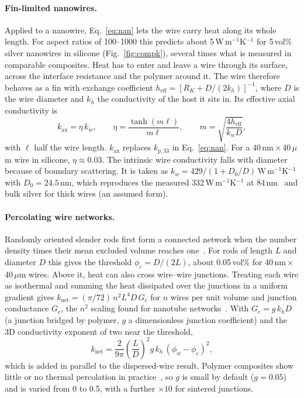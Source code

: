 \documentclass[11pt]{article}
\begin{document}
\paragraph{Fin-limited nanowires.} Applied to a nanowire, Eq.~\eqref{eq:nan} lets the
wire carry heat along its whole length. For aspect ratios of 100--1000 this predicts
about 5\,W\,m$^{-1}$K$^{-1}$ for 5\,vol\% silver nanowires in silicone
(Fig.~\ref{fig:compk}), several times what is measured in comparable composites. Heat
has to enter and leave a wire through its surface, across the interface resistance and
the polymer around it. The wire therefore behaves as a fin with exchange coefficient
$h_\mathrm{eff} = [R_K + D/(2k_h)]^{-1}$, where $D$ is the wire diameter and $k_h$ the
conductivity of the host it sits in. Its effective axial conductivity is
\begin{equation}
  k_\mathrm{ax} = \eta\,k_w, \qquad \eta = \frac{\tanh(m\ell)}{m\ell}, \qquad
  m = \sqrt{\frac{4h_\mathrm{eff}}{k_w D}},
  \label{eq:fin}
\end{equation}
with $\ell$ half the wire length. $k_\mathrm{ax}$ replaces $k_{p,33}$ in
Eq.~\eqref{eq:nan}. For a 40\,nm\,$\times$\,40\,$\mu$m wire in silicone,
$\eta \approx 0.03$. The intrinsic wire conductivity falls with diameter because of
boundary scattering. It is taken as $k_w = 429/(1 + D_0/D)$\,W\,m$^{-1}$K$^{-1}$ with
$D_0 = 24.5$\,nm, which reproduces the measured 332\,W\,m$^{-1}$K$^{-1}$ at
84\,nm~\cite{agnw_nsf} and bulk silver for thick wires (an assumed form).

\paragraph{Percolating wire networks.} Randomly oriented slender rods first form a
connected network when the number density times their mean excluded volume reaches
one~\cite{balberg1984,florian2001}. For rods of length $L$ and diameter $D$ this gives the
threshold $\phi_c = D/(2L)$, about 0.05\,vol\% for 40\,nm\,$\times$\,40\,$\mu$m wires.
Above it, heat can also cross wire--wire junctions. Treating each wire as isothermal and
summing the heat dissipated over the junctions in a uniform gradient gives
$k_\mathrm{net} = (\pi/72)\,n^2 L^4 D\,G_c$ for $n$ wires per unit volume and junction
conductance $G_c$, the $n^2$ scaling found for nanotube
networks~\cite{volkov2010}. With $G_c = g\,k_h D$ (a junction bridged by polymer, $g$
a dimensionless junction coefficient) and the 3D conductivity exponent of two near the
threshold,
\begin{equation}
  k_\mathrm{net} = \frac{2}{9\pi}\left(\frac{L}{D}\right)^{2} g\,k_h\,(\phi_w - \phi_c)^2 ,
  \label{eq:net}
\end{equation}
which is added in parallel to the dispersed-wire result. Polymer composites show little
or no thermal percolation in practice~\cite{shenogina2005}, so $g$ is small by default
($g = 0.05$) and is varied from 0 to 0.5, with a further $\times10$ for sintered junctions.
\end{document}
